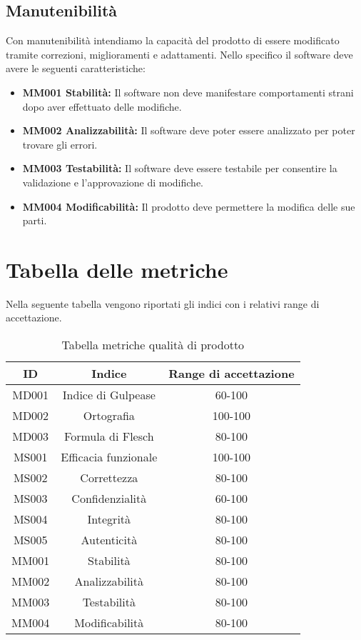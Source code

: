 \subsection{Manutenibilità}
Con manutenibilità intendiamo la capacità del prodotto di essere modificato tramite correzioni, miglioramenti e adattamenti.
Nello specifico il software deve avere le seguenti caratteristiche:
\begin{itemize}
	\item \textbf{MM001 Stabilità:} Il software non deve manifestare comportamenti strani dopo aver effettuato delle modifiche.
	\item \textbf{MM002 Analizzabilità:} Il software deve poter essere analizzato per poter trovare gli errori.
	\item \textbf{MM003 Testabilità:} Il software deve essere testabile per consentire la validazione e l'approvazione di modifiche.
	\item \textbf{MM004 Modificabilità:} Il prodotto deve permettere la modifica delle sue parti.
\end{itemize}
\section{Tabella delle metriche}
Nella seguente tabella vengono riportati gli indici con i relativi range di accettazione.\\
\begin{table}[h]
    \begin{center}
      \begin{tabular}{|c|c|c|}
        \hline
        \textbf{ID} & \textbf{Indice}       & \textbf{Range di accettazione}\\
        \hline
        MD001       & Indice di Gulpease    & 60-100\\
        MD002       & Ortografia            & 100-100\\
        MD003       & Formula di Flesch     & 80-100\\\hline
        MS001       & Efficacia funzionale  & 100-100\\
        MS002       & Correttezza  			& 80-100\\
        MS003       & Confidenzialità 	 	& 60-100\\
        MS004       & Integrità  			& 80-100\\
        MS005       & Autenticità		    & 80-100\\\hline
        MM001       & Stabilità 		    & 80-100\\
        MM002       & Analizzabilità		& 80-100\\
        MM003       & Testabilità		    & 80-100\\
        MM004       & Modificabilità		& 80-100\\
        \hline
      \end{tabular}
      \caption{Tabella metriche qualità di prodotto}
    \end{center}
\end{table}